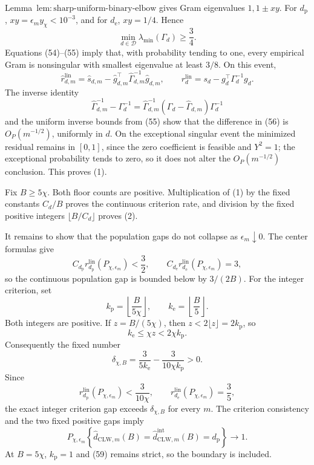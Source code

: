 Lemma~\(\mathrm{lem{:}sharp\text{-}uniform\text{-}binary\text{-}elbow}\) gives Gram eigenvalues \(1,1\pm xy\).  For \(d_{\mathrm p}\), \(xy=\epsilon_my_\chi<10^{-3}\), and for \(d_{\mathrm e}\), \(xy=1/4\).  Hence
\[
 \min_{d\in\mathcal D}\lambda_{\min}(\Gamma_d)\ge\frac34. \tag{55}
\]
Equations (54)--(55) imply that, with probability tending to one, every empirical Gram is nonsingular with smallest eigenvalue at least \(3/8\).  On this event,
\[
 \widehat r_{d,m}^{\mathrm{lin}}
 =\widehat s_{d,m}-\widehat g_{d,m}^\top
 \widehat\Gamma_{d,m}^{-1}\widehat g_{d,m},
 \qquad
 r_d^{\mathrm{lin}}=s_d-g_d^\top\Gamma_d^{-1}g_d.          \tag{56}
\]
The inverse identity
\[
 \widehat\Gamma_{d,m}^{-1}-\Gamma_d^{-1}
 =\widehat\Gamma_{d,m}^{-1}
 (\Gamma_d-\widehat\Gamma_{d,m})\Gamma_d^{-1}             \tag{57}
\]
and the uniform inverse bounds from (55) show that the difference in (56) is \(O_P(m^{-1/2})\), uniformly in \(d\).  On the exceptional singular event the minimized residual remains in \([0,1]\), since the zero coefficient is feasible and \(Y^2=1\); the exceptional probability tends to zero, so it does not alter the \(O_P(m^{-1/2})\) conclusion.  This proves (1).

Fix \(B\ge5\chi\).  Both floor counts are positive.  Multiplication of (1) by the fixed constants \(C_d/B\) proves the continuous criterion rate, and division by the fixed positive integers \(\lfloor B/C_d\rfloor\) proves (2).

It remains to show that the population gaps do not collapse as \(\epsilon_m\downarrow0\).  The center formulas give
\[
 C_{d_{\mathrm p}}r_{d_{\mathrm p}}^{\mathrm{lin}}(P_{\chi,\epsilon_m})<\frac32,
 \qquad
 C_{d_{\mathrm e}}r_{d_{\mathrm e}}^{\mathrm{lin}}(P_{\chi,\epsilon_m})=3, \tag{58}
\]
so the continuous population gap is bounded below by \(3/(2B)\).  For the integer criterion, set
\[
 k_{\mathrm p}=\left\lfloor\frac{B}{5\chi}\right\rfloor,
 \qquad
 k_{\mathrm e}=\left\lfloor\frac B5\right\rfloor.
\]
Both integers are positive.  If \(z=B/(5\chi)\), then \(z<2\lfloor z\rfloor=2k_{\mathrm p}\), so
\[
 k_{\mathrm e}\le\chi z<2\chi k_{\mathrm p}.
\]
Consequently the fixed number
\[
 \delta_{\chi,B}
 =\frac{3}{5k_{\mathrm e}}-
 \frac{3}{10\chi k_{\mathrm p}}>0.                        \tag{59}
\]
Since
\[
 r_{d_{\mathrm p}}^{\mathrm{lin}}(P_{\chi,\epsilon_m})
 <\frac3{10\chi},
 \qquad
 r_{d_{\mathrm e}}^{\mathrm{lin}}(P_{\chi,\epsilon_m})=\frac35,
\]
the exact integer criterion gap exceeds \(\delta_{\chi,B}\) for every \(m\).  The criterion consistency and the two fixed positive gaps imply
\[
 P_{\chi,\epsilon_m}\!\left\{
 \widehat d_{\mathrm{CLW},m}(B)
 =\widehat d_{\mathrm{CLW},m}^{\mathrm{int}}(B)
 =d_{\mathrm p}\right\}\longrightarrow1.                \tag{60}
\]
At \(B=5\chi\), \(k_{\mathrm p}=1\) and (59) remains strict, so the boundary is included.


